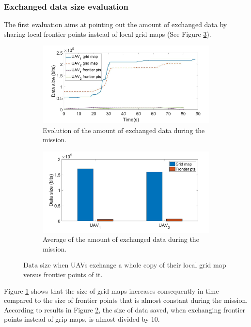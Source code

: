 \documentclass[11pt,openany]{book}
\begin{document}
\subsubsection{Exchanged data size evaluation}
The ﬁrst evaluation aims at pointing out the amount of exchanged data by sharing local frontier points instead of local grid maps (See Figure \ref{fig:4.9}).
\begin{figure}[H]
    \centering
    \begin{subfigure}[H]{0.8\linewidth}
        \includegraphics[width=\linewidth]{assets/4_9_a.png}
        \caption{{Evolution of the amount of exchanged data during the mission.}}
        \label{fig:4.9a}
    \end{subfigure}
    \begin{subfigure}[H]{0.8\linewidth}
        \includegraphics[width=\linewidth]{assets/4_9_b.png}
        \caption{{Average of the amount of exchanged data during the mission.}}
        \label{fig:4.9b}
    \end{subfigure}
    \caption{{Data size when UAVs exchange a whole copy of their local grid map versus frontier points of it.}}
    \label{fig:4.9}
\end{figure}
Figure \ref{fig:4.9a} shows that the size of grid maps increases consequently in time compared to the size of frontier points that is almost constant during the mission. According to results in Figure \ref{fig:4.9b}, the size of data saved, when exchanging frontier points instead of grip maps, is almost divided by 10.
\end{document}
